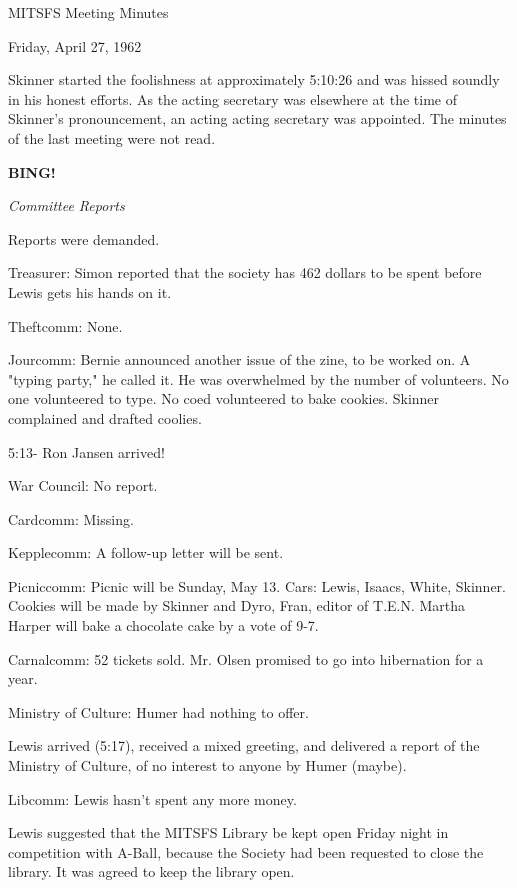 \documentclass[12pt]{article}
\newcommand{\bing}{{\bf BING!} }
\newcommand{\goto}[1]{\bing \vskip 12pt \centerline{{\em{#1}}}}
\begin{document}
\begin{center}

MITSFS Meeting Minutes

Friday, April 27, 1962

\end{center}
 
\vspace{12pt}

\setlength{\parskip}{6pt}

\noindent
Skinner started the foolishness at approximately 5:10:26 and was hissed soundly in his honest efforts. As the acting secretary was elsewhere at the time of Skinner's pronouncement, an acting acting secretary was appointed. The minutes of the last meeting were not read.

\goto{Committee Reports}

Reports were demanded.

Treasurer: Simon reported that the society has 462 dollars to be spent before Lewis gets his hands on it.

Theftcomm: None.

Jourcomm: Bernie announced another issue of the zine, to be worked on. A "typing party," he called it. He was overwhelmed by the number of volunteers. No one volunteered to type. No coed volunteered to bake cookies. Skinner complained and drafted coolies.

5:13- Ron Jansen arrived!

War Council: No report.

Cardcomm: Missing.

Kepplecomm: A follow-up letter will be sent.

Picniccomm: Picnic will be Sunday, May 13. Cars: Lewis, Isaacs, White, Skinner. Cookies will be made by Skinner and Dyro, Fran, editor of T.E.N. Martha Harper will bake a chocolate cake by a vote of 9-7.

Carnalcomm: 52 tickets sold. Mr. Olsen promised to go into hibernation for a year.

Ministry of Culture: Humer had nothing to offer.

Lewis arrived (5:17), received a mixed greeting, and delivered a report of the Ministry of Culture, of no interest to anyone by Humer (maybe).

Libcomm: Lewis hasn't spent any more money.

Lewis suggested that the MITSFS Library be kept open Friday night in competition with A-Ball, because the Society had been requested to close the library. It was agreed to keep the library open.
\end{document}
